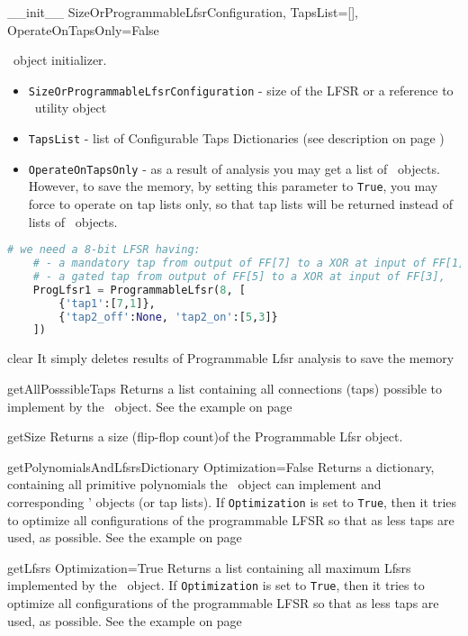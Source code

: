  {\_\_init\_\_} {SizeOrProgrammableLfsrConfiguration, TapsList=[], OperateOnTapsOnly=False} {
	\ProgrammableLfsr\ object initializer.
	\begin{itemize}
		\item \texttt{SizeOrProgrammableLfsrConfiguration} - size of the LFSR or a reference to \ProgrammableLfsrConfig\ utility object
		\item \texttt{TapsList} - list of Configurable Taps Dictionaries (see description on page \pageref{configurabletapsdictionary})
		\item \texttt{OperateOnTapsOnly} - as a result of analysis you may get a list of \Lfsr\ objects. However, to save the memory, by setting this parameter to \texttt{True}, you may force to operate on tap lists only, so that tap lists will be returned instead of lists of \Lfsr\ objects.
	\end{itemize}
}
\begin{lstlisting}[language=Python]
	# we need a 8-bit LFSR having:
	# - a mandatory tap from output of FF[7] to a XOR at input of FF[1],
	# - a gated tap from output of FF[5] to a XOR at input of FF[3], 
	ProgLfsr1 = ProgrammableLfsr(8, [
		{'tap1':[7,1]},
		{'tap2_off':None, 'tap2_on':[5,3]}
	])
\end{lstlisting}

 {clear} {} {
	It simply deletes results of Programmable Lfsr analysis to save the memory
}

 {getAllPosssibleTaps} {} {
	Returns a list containing all connections (taps) possible to implement by the \ProgrammableLfsr\ object. 
	See the example on page \pageref{programmablelfsrexample}
}

 {getSize} {} {
	Returns a size (flip-flop count)of the Programmable Lfsr object.
}

 {getPolynomialsAndLfsrsDictionary} {Optimization=False} {
	Returns a dictionary, containing all primitive polynomials the \ProgrammableLfsr\ object can implement and corresponding \Lfsr' objects (or tap lists). If \texttt{Optimization} is set to \texttt{True}, then it tries to optimize all configurations of the programmable LFSR so that as less taps are used, as possible.
	See the example on page \pageref{programmablelfsrexample}
}

 {getLfsrs} {Optimization=True} {
	Returns a list containing all maximum Lfsrs implemented by the \ProgrammableLfsr\ object. If \texttt{Optimization} is set to \texttt{True}, then it tries to optimize all configurations of the programmable LFSR so that as less taps are used, as possible.
	See the example on page \pageref{programmablelfsrexample}
}

